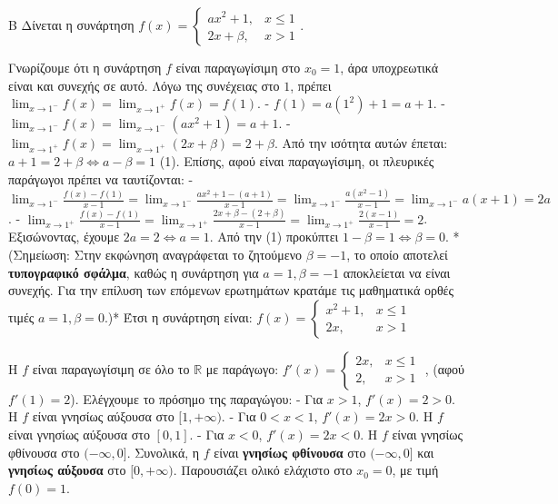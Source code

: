 \begin{thema}{Β}
Δίνεται η συνάρτηση $f(x) = \begin{cases} a x^2+1, & x \le 1 \\ 2x+\beta, & x > 1 \end{cases}$.
\begin{erwthma}
\item Γνωρίζουμε ότι η συνάρτηση $f$ είναι παραγωγίσιμη στο $x_0 = 1$, άρα υποχρεωτικά είναι και συνεχής σε αυτό.
Λόγω της συνέχειας στο $1$, πρέπει $\lim_{x\to1^-} f(x) = \lim_{x\to1^+} f(x) = f(1)$.
- $f(1) = a(1^2)+1 = a+1$.
- $\lim_{x\to1^-} f(x) = \lim_{x\to1^-} (ax^2+1) = a+1$.
- $\lim_{x\to1^+} f(x) = \lim_{x\to1^+} (2x+\beta) = 2+\beta$.
Από την ισότητα αυτών έπεται: $a+1 = 2+\beta \Leftrightarrow a - \beta = 1$ (1).
Επίσης, αφού είναι παραγωγίσιμη, οι πλευρικές παράγωγοι πρέπει να ταυτίζονται:
- $\lim_{x\to1^-} \frac{f(x)-f(1)}{x-1} = \lim_{x\to1^-} \frac{ax^2+1 - (a+1)}{x-1} = \lim_{x\to1^-} \frac{a(x^2-1)}{x-1} = \lim_{x\to1^-} a(x+1) = 2a$.
- $\lim_{x\to1^+} \frac{f(x)-f(1)}{x-1} = \lim_{x\to1^+} \frac{2x+\beta - (2+\beta)}{x-1} = \lim_{x\to1^+} \frac{2(x-1)}{x-1} = 2$.
Εξισώνοντας, έχουμε $2a = 2 \Leftrightarrow a=1$.
Από την (1) προκύπτει $1-\beta = 1 \Leftrightarrow \beta = 0$.
*(Σημείωση: Στην εκφώνηση αναγράφεται το ζητούμενο $\beta = -1$, το οποίο αποτελεί \textbf{τυπογραφικό σφάλμα}, καθώς η συνάρτηση για $a=1, \beta=-1$ αποκλείεται να είναι συνεχής. Για την επίλυση των επόμενων ερωτημάτων κρατάμε τις μαθηματικά ορθές τιμές $a=1, \beta=0$.)*
Έτσι η συνάρτηση είναι:
$f(x) = \begin{cases} x^2+1, & x \le 1 \\ 2x, & x > 1 \end{cases}$

\item Η $f$ είναι παραγωγίσιμη σε όλο το $\mathbb{R}$ με παράγωγο:
$f'(x) = \begin{cases} 2x, & x \le 1 \\ 2, & x > 1 \end{cases}$ , (αφού $f'(1) = 2$).
Ελέγχουμε το πρόσημο της παραγώγου:
- Για $x > 1$, $f'(x) = 2 > 0$. Η $f$ είναι γνησίως αύξουσα στο $[1, +\infty)$.
- Για $0 < x < 1$, $f'(x) = 2x > 0$. Η $f$ είναι γνησίως αύξουσα στο $[0, 1]$.
- Για $x < 0$, $f'(x) = 2x < 0$. Η $f$ είναι γνησίως φθίνουσα στο $(-\infty, 0]$.
Συνολικά, η $f$ είναι \textbf{γνησίως φθίνουσα} στο $(-\infty, 0]$ και \textbf{γνησίως αύξουσα} στο $[0, +\infty)$.
Παρουσιάζει ολικό ελάχιστο στο $x_0 = 0$, με τιμή $f(0) = 1$.


\end{erwthma}
\end{thema}
